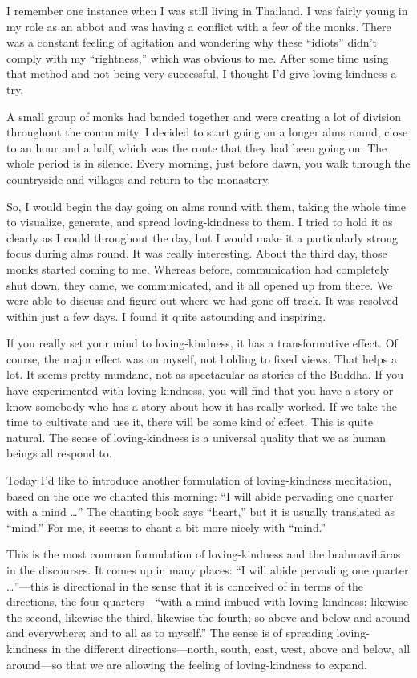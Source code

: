 I remember one instance when I was still living in Thailand. I was
fairly young in my role as an abbot and was having a conflict with a few
of the monks. There was a constant feeling of agitation and wondering
why these “idiots” didn’t comply with my “rightness,” which was obvious
to me. After some time using that method and not being very successful,
I thought I’d give loving-kindness a try.

A small group of monks had banded together and were creating a lot of
division throughout the community. I decided to start going on a longer
alms round, close to an hour and a half, which was the route that they
had been going on. The whole period is in silence. Every morning, just
before dawn, you walk through the countryside and villages and return to
the monastery.

So, I would begin the day going on alms round with them, taking the
whole time to visualize, generate, and spread loving-kindness to them. I
tried to hold it as clearly as I could throughout the day, but I would
make it a particularly strong focus during alms round. It was really
interesting. About the third day, those monks started coming to me.
Whereas before, communication had completely shut down, they came, we
communicated, and it all opened up from there. We were able to discuss
and figure out where we had gone off track. It was resolved within just
a few days. I found it quite astounding and inspiring.

If you really set your mind to loving-kindness, it has a transformative
effect. Of course, the major effect was on myself, not holding to fixed
views. That helps a lot. It seems pretty mundane, not as spectacular as
stories of the Buddha. If you have experimented with loving-kindness,
you will find that you have a story or know somebody who has a story
about how it has really worked. If we take the time to cultivate and use
it, there will be some kind of effect. This is quite natural. The sense
of loving-kindness is a universal quality that we as human beings all
respond to.

Today I’d like to introduce another formulation of loving-kindness
meditation, based on the one we chanted this morning: “I will abide
pervading one quarter with a mind \ldots{}” The chanting book says “heart,”
but it is usually translated as “mind.” For me, it seems to chant a bit
more nicely with “mind.”

This is the most common formulation of loving-kindness and the
brahmavihāras in the discourses. It comes up in many places: “I will
abide pervading one quarter \ldots{}”—this is directional in the sense that
it is conceived of in terms of the directions, the four quarters—“with a
mind imbued with loving-kindness; likewise the second, likewise the
third, likewise the fourth; so above and below and around and
everywhere; and to all as to myself.” The sense is of spreading
loving-kindness in the different directions—north, south, east, west,
above and below, all around—so that we are allowing the feeling of
loving-kindness to expand.

